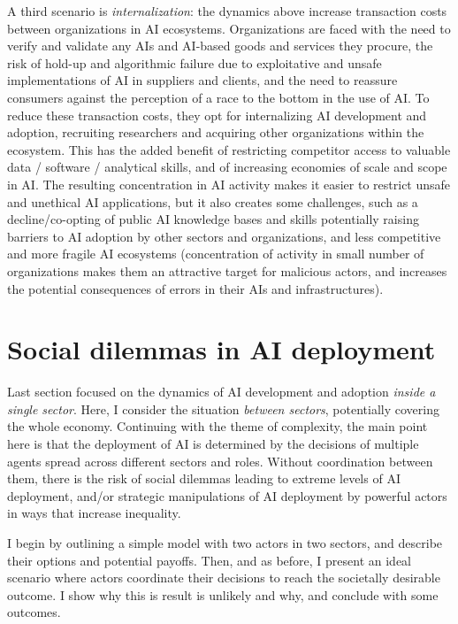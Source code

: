 \documentclass[11pt]{article}
\begin{document}
A third scenario is \textit{internalization}: the dynamics above increase transaction costs between organizations in AI ecosystems. Organizations are faced with the need to verify and validate any AIs and AI-based goods and services they procure, the risk of hold-up and algorithmic failure due to exploitative and unsafe implementations of AI in suppliers and clients, and the need to reassure consumers against the perception of a race to the bottom in the use of AI. To reduce these transaction costs, they opt for internalizing AI development and adoption, recruiting researchers and acquiring other organizations within the ecosystem. This has the added benefit of restricting competitor access to valuable data / software / analytical skills, and of increasing economies of scale and scope in AI. The resulting concentration in AI activity makes it easier to restrict unsafe and unethical AI applications, but it also creates some challenges, such as a decline/co-opting of public AI knowledge bases and skills potentially raising barriers to AI adoption by other sectors and organizations, and less competitive and more fragile AI ecosystems (concentration of activity in small number of organizations makes them an attractive target for malicious actors, and increases the potential consequences of errors in their AIs and infrastructures).

\section{Social dilemmas in AI deployment}
\label{subsec:macro}

Last section focused on the dynamics of AI development and adoption \textit{inside a single sector}. Here, I consider the situation \textit{between sectors}, potentially covering the whole economy. Continuing with the theme of complexity, the main point here is that the deployment of AI is determined by the decisions of multiple agents spread across different sectors and roles. Without coordination between them, there is the risk of social dilemmas leading to extreme levels of AI deployment, and/or strategic manipulations of AI deployment by powerful actors in ways that increase inequality. 

I begin by outlining a simple model with two actors in two sectors, and describe their options and potential payoffs. Then, and as before, I present an ideal scenario where actors coordinate their decisions to reach the societally desirable outcome. I show why this is result is unlikely and why, and conclude with some outcomes. 
\end{document}
